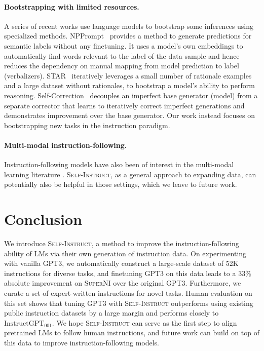 \documentclass[11pt]{article}
\newcommand{\name}{\textsc{Self-Instruct}}
\newcommand{\supernatShort}{\textsc{SuperNI}}
\newcommand{\gptthree}{\textsc{GPT3}}
\newcommand{\gptinstruct}[1]{$\text{InstructGPT}_{\text{#1}}$}
\begin{document}
\paragraph{Bootstrapping with limited resources.} A series of recent works use language models to bootstrap some inferences using specialized methods.  
NPPrompt~\cite{zhao2022pre} provides a method to generate predictions for semantic labels without any finetuning. It uses a model's own embeddings to automatically find words relevant to the label of the data sample and hence reduces the dependency on manual mapping from model prediction to label (verbalizers).
STAR~\cite{zelikman2022star} iteratively leverages a small number of rationale examples and a large dataset without rationales, to bootstrap a model's ability to perform reasoning.  Self-Correction~\cite{welleck2022generating} decouples an imperfect base generator (model) from a separate corrector that learns to iteratively correct imperfect generations and demonstrates improvement over the base generator. Our work instead focuses on bootstrapping new tasks in the instruction paradigm.

\paragraph{Multi-modal instruction-following.}
Instruction-following models have also been of interest in the multi-modal learning literature \cite{fried2018speaker, shridhar2020alfred, min2022film, weir2022one}.
\name{}, as a general approach to expanding data, can potentially also be helpful in those settings, which we leave to future work.

\section{Conclusion}
\label{sec:conclusion}
We introduce \name{}, a method to improve the instruction-following ability of LMs via their own generation of instruction data. On experimenting with vanilla \gptthree{}, we automatically construct a large-scale dataset of 52K instructions for diverse tasks, and finetuning GPT3 on this data leads to a 33\% absolute improvement on \supernatShort{} over the original \gptthree{}. Furthermore, we curate a set of expert-written instructions for novel tasks. Human evaluation on this set shows that tuning GPT3 with \name{} outperforms using existing public instruction datasets by a large margin and performs closely to \gptinstruct{001}.
We hope \name{} can serve as the first step to align pretrained LMs to follow human instructions, and future work can build on top of this data to improve instruction-following models.
\end{document}
